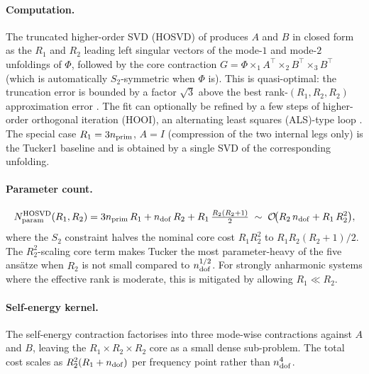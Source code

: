 \paragraph{Computation.} The truncated higher-order SVD (HOSVD) of
\citet{de_lathauwer_multilinear_2000} produces $A$ and $B$ in closed form as the $R_1$ and $R_2$
leading left singular vectors of the mode-$1$ and mode-$2$ unfoldings of $\Phi$, followed by the
core contraction $G = \Phi\times_1 A^\top\times_2 B^\top\times_3 B^\top$ (which is automatically
$S_2$-symmetric when $\Phi$ is). This is quasi-optimal: the truncation error is bounded by a
factor $\sqrt{3}$ above the best rank-$(R_1,R_2,R_2)$ approximation error
\cite{hackbusch_tensor_2019, oseledets_tensor-train_2011}. The fit can optionally be refined by a
few steps of higher-order orthogonal iteration (HOOI), an alternating least squares (ALS)-type loop
 \cite{de_lathauwer_best_2000}. The special case $R_1=3n_{\mathrm{prim}}$, $A=I$ (compression of the two
internal legs only) is the Tucker1 baseline and is obtained by a single SVD of the corresponding
unfolding.

\paragraph{Parameter count.}
\begin{equation}\label{eq:fc3_tucker_params}
  N_{\mathrm{param}}^{\mathrm{HOSVD}}(R_1,R_2)
  = 3n_{\mathrm{prim}}\,R_1 + n_{\mathrm{dof}}\,R_2 + R_1\,\tfrac{R_2(R_2+1)}{2}
  \;\sim\; \mathcal{O}\!\bigl(R_2\,n_{\mathrm{dof}} + R_1\,R_2^{2}\bigr),
\end{equation}
where the $S_2$ constraint halves the nominal core cost $R_1 R_2^{2}$ to $R_1 R_2(R_2+1)/2$.
The $R_2^{2}$-scaling core term makes Tucker the most parameter-heavy of the five ans\"atze
when $R_2$ is not small compared to $n_{\mathrm{dof}}^{1/2}$. For strongly anharmonic systems where the
effective rank is moderate, this is mitigated by allowing $R_1\ll R_2$.

\paragraph{Self-energy kernel.} The self-energy contraction factorises into three mode-wise
contractions against $A$ and $B$, leaving the $R_1\times R_2\times R_2$ core as a small dense
sub-problem. The total cost scales as $R_2^{2}(R_1+n_{\mathrm{dof}})$ per frequency point rather than
$n_{\mathrm{dof}}^{4}$.

